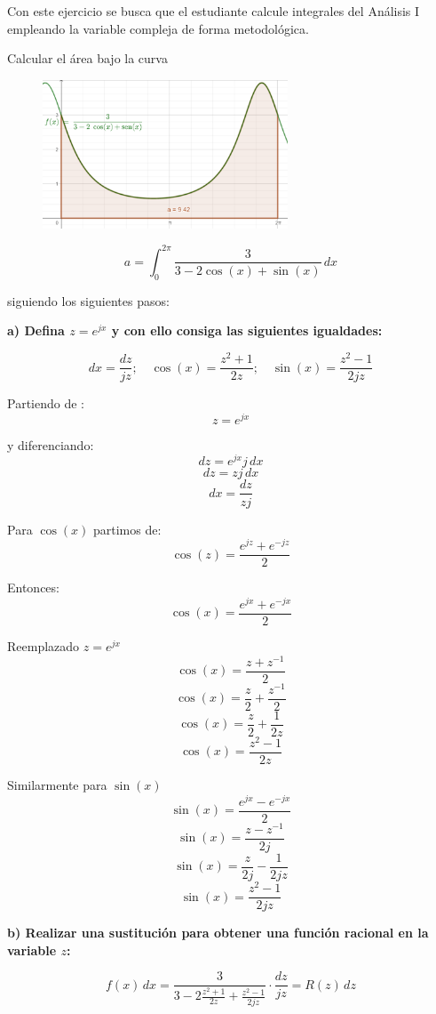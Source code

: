 \documentclass[12pt]{report}
\begin{document}
Con este ejercicio se busca que el estudiante calcule integrales del Análisis I empleando la variable
compleja de forma metodológica.

Calcular el área bajo la curva\\


\begin{figure}[h] %
    \centering %
    \includegraphics[width=0.65\textwidth]{./Imagenes/foto1Ej7.png} %
\end{figure}

$$a = \int_{0}^{2\pi} \frac{3}{3 - 2\cos(x) + \sin(x)} \, dx$$

siguiendo los siguientes pasos:

\textbf{a)  Defina $z = e^{jx}$ y con ello consiga las siguientes igualdades:}

$$dx = \frac{dz}{jz}; \quad \cos(x) = \frac{z^{2} + 1}{2z}; \quad \sin(x) = \frac{z^{2} - 1}{2jz}$$

Partiendo de :
$$z = e^{jx}$$

y diferenciando:
$$dz = e^{jx}j \, dx$$
$$dz = zj \, dx$$
$$dx = \frac{dz}{zj}$$

Para $\cos(x)$ partimos de:
$$\cos(z)=\frac{e^{jz}+e^{-jz}}{2}$$

Entonces:
$$\cos(x)=\frac{e^{jx}+e^{-jx}}{2}$$

Reemplazado $z=e^{jx}$
$$\cos(x)=\frac{z+z^{-1}}{2}$$
$$\cos(x)=\frac{z}{2}+\frac{z^{-1}}{2}$$
$$\cos(x)=\frac{z}{2}+\frac{1}{2z}$$
$$\cos(x)=\frac{z^2-1}{2z}$$

Similarmente para $\sin(x)$
$$\sin(x)=\frac{e^{jx}-e^{-jx}}{2}$$
$$\sin(x)=\frac{z-z^{-1}}{2j}$$
$$\sin(x)=\frac{z}{2j}-\frac{1}{2jz}$$
$$\sin(x)=\frac{z^2-1}{2jz}$$

\textbf{b)  Realizar una sustitución para obtener una función racional en la variable $z$:}

$$ f(x) \, dx = \frac{3}{3 - 2\frac{z^{2} + 1}{2z} + \frac{z^{2} - 1}{2jz}} \cdot \frac{dz}{jz} = R(z) \, dz $$ 
\end{document}
